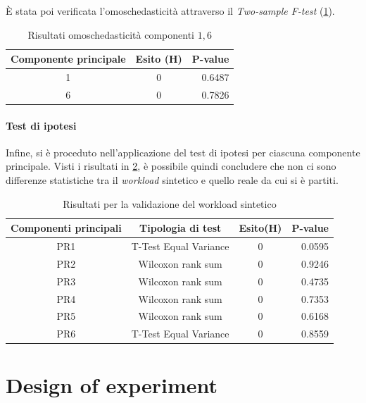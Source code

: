 È stata poi verificata l'omoschedasticità attraverso il \textit{Two-sample F-test} (\cref{tab:ll1_omoschedasticit}).

\begin{table}[H]
\centering
    \begin{tabular}{|c|c|r|}
    \hline
    \multicolumn{1}{|c|}{\textbf{Componente principale}} &
    \multicolumn{1}{|c|}{\textbf{Esito (H)}} &
    \multicolumn{1}{|c|}{\textbf{P-value}}
    \tabularnewline \hline

1 & 0 & 0.6487 \tabularnewline \hline
6 & 0 & 0.7826 \tabularnewline \hline
\end{tabular}
\caption{Risultati omoschedasticità componenti $1,6$}
\label{tab:ll1_omoschedasticit}
\end{table}


\paragraph{Test di ipotesi} Infine, si è proceduto nell'applicazione del test di ipotesi per ciascuna componente principale. Visti i risultati in \cref{tab:validation_test}, è possibile quindi concludere che non ci sono differenze statistiche tra il \textit{workload} sintetico e quello reale da cui si è partiti.

\begin{table}[H]
\centering
    \begin{tabular}{|c|c|c|r|}
    \hline
    \multicolumn{1}{|c|}{\textbf{Componenti principali}} &
    \multicolumn{1}{|c|}{\textbf{Tipologia di test}} &
    \multicolumn{1}{|c|}{\textbf{Esito(H)}} &
    \multicolumn{1}{|c|}{\textbf{P-value}}
    \tabularnewline \hline

PR1 & T-Test Equal Variance  & 0 & 0.0595 \tabularnewline \hline
PR2 & Wilcoxon rank sum  & 0 & 0.9246 \tabularnewline \hline
PR3 & Wilcoxon rank sum  & 0 & 0.4735 \tabularnewline \hline
PR4 & Wilcoxon rank sum  & 0 & 0.7353 \tabularnewline \hline
PR5 & Wilcoxon rank sum  & 0 & 0.6168 \tabularnewline \hline
PR6 & T-Test Equal Variance  & 0 & 0.8559 \tabularnewline \hline
\end{tabular}
\caption{Risultati per la validazione del workload sintetico}
\label{tab:validation_test}
\end{table}



\newpage
\section{Design of experiment}

